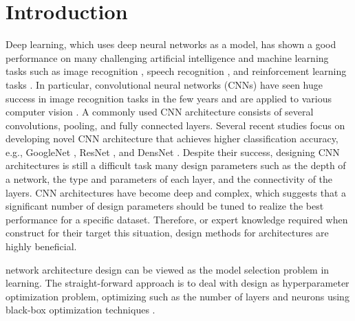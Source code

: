 \section{Introduction}

Deep learning, which uses deep neural networks as a model, has shown a good performance on many challenging artificial intelligence and machine learning tasks\new{,} such as image recognition \cite{lecun_gradient-based_1998,krizhevsky_imagenet_2012}, speech recognition \cite{hinton_deep_2012}, and reinforcement learning tasks \cite{mnih_playing_2013,mnih_human-level_2015}.
In particular, convolutional neural networks (CNNs) \cite{lecun_gradient-based_1998} have seen huge success in image recognition tasks in the  few years and are applied to various computer vision  \cite{vinyals_show_2015,zhang_colorful_2016}.
A commonly used CNN architecture consists  of several convolutions, pooling, and fully connected layers.
Several recent studies focus on developing  novel CNN architecture that achieves higher classification accuracy, e.g., GoogleNet \cite{szegedy_going_2015}, ResNet \cite{he_deep_2016}, and DensNet \cite{huang_densely_2016}.
Despite their success, designing CNN architectures is still a difficult task  many design parameters  such as the depth of a network, the type and parameters of each layer, and the connectivity of the layers.
 CNN architectures have become deep and complex, which suggests that a significant number of design parameters should be tuned to realize the best performance for a specific dataset.
Therefore,  or expert knowledge  required when  construct   for their target 
 this situation,  design methods for  architectures are highly beneficial.

 network architecture design can be viewed as the model selection problem in  learning. The straight-forward approach is to deal with  design as  hyperparameter optimization problem, optimizing   such as the number of layers and neurons\new{,} using black-box optimization techniques \cite{loshchilov_cma-es_2016,snoek_practical_2012}.

